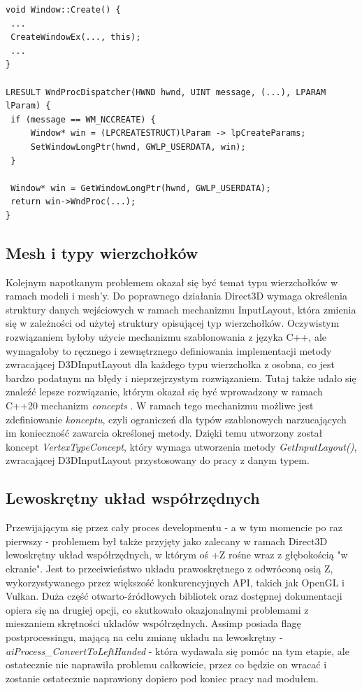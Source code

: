 \vfill

\begin{lstlisting}[caption={Pseudokod integracji wskaźnika okna z uchwytem HWND}, label={lst:module:WndProcDispatcher}]
void Window::Create() {
 ...
 CreateWindowEx(..., this);
 ...
}

LRESULT WndProcDispatcher(HWND hwnd, UINT message, (...), LPARAM lParam) {
 if (message == WM_NCCREATE) {
     Window* win = (LPCREATESTRUCT)lParam -> lpCreateParams;
     SetWindowLongPtr(hwnd, GWLP_USERDATA, win);
 }
	
 Window* win = GetWindowLongPtr(hwnd, GWLP_USERDATA);
 return win->WndProc(...);
}
\end{lstlisting}

\subsection{Mesh i typy wierzchołków}
Kolejnym napotkanym problemem okazał się być temat typu wierzchołków w ramach modeli i mesh'y. Do poprawnego działania Direct3D wymaga określenia struktury danych wejściowych w ramach mechanizmu InputLayout, która zmienia się w zależności od użytej struktury opisującej typ wierzchołków. Oczywistym rozwiązaniem byłoby użycie mechanizmu szablonowania z języka C++, ale wymagałoby to ręcznego i zewnętrznego definiowania implementacji metody zwracającej D3DInputLayout dla każdego typu wierzchołka z osobna, co jest bardzo podatnym na błędy i nieprzejrzystym rozwiązaniem. Tutaj także udało się znaleźć lepsze rozwiązanie, którym okazał się być wprowadzony w ramach C++20 mechanizm \textit{concepts} \cite{cpp20:concepts:2025}. W ramach tego mechanizmu możliwe jest zdefiniowanie \textit{konceptu}, czyli ograniczeń dla typów szablonowych narzucających im konieczność zawarcia określonej metody. Dzięki temu utworzony został koncept \textit{VertexTypeConcept}, który wymaga utworzenia metody \textit{GetInputLayout()}, zwracającej D3DInputLayout przystosowany do pracy z danym typem.

\subsection{Lewoskrętny układ współrzędnych}
Przewijającym się przez cały proces developmentu - a w tym momencie po raz pierwszy - problemem był także przyjęty jako zalecany w ramach Direct3D lewoskrętny układ współrzędnych, w którym oś +Z rośne wraz z głębokością "w ekranie". Jest to przeciwieństwo układu prawoskrętnego z odwróconą osią Z, wykorzystywanego przez większość konkurencyjnych API, takich jak OpenGL i Vulkan. Duża część otwarto-źródłowych bibliotek oraz dostępnej dokumentacji opiera się na drugiej opcji, co skutkowało okazjonalnymi problemami z mieszaniem skrętności układów współrzędnych. Assimp posiada flagę postprocessingu, mającą na celu zmianę układu na lewoskrętny - \textit{aiProcess\_ConvertToLeftHanded} - która wydawała się pomóc na tym etapie, ale ostatecznie nie naprawiła problemu całkowicie, przez co będzie on wracać i zostanie ostatecznie naprawiony dopiero pod koniec pracy nad modułem.

